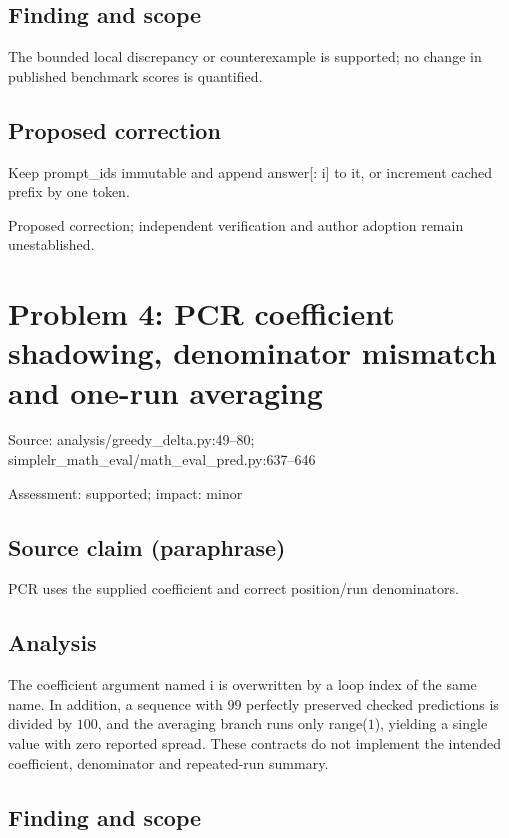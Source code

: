 \documentclass[11pt]{article}
\begin{document}
\subsection*{Finding and scope}

The bounded local discrepancy or counterexample is supported; no change in published benchmark scores is quantified.

\subsection*{Proposed correction}

Keep prompt\_ids immutable and append answer[: i] to it, or increment cached prefix by one token.

Proposed correction; independent verification and author adoption remain unestablished.

\section*{Problem 4: PCR coefficient shadowing, denominator mismatch and one-run averaging}

Source: analysis/greedy\_delta.py:49–80; simplelr\_math\_eval/math\_eval\_pred.py:637–646

Assessment: supported; impact: minor

\subsection*{Source claim (paraphrase)}

PCR uses the supplied coefficient and correct position/run denominators.

\subsection*{Analysis}

The coefficient argument named i is overwritten by a loop index of the same name. In addition, a sequence with \(99\) perfectly preserved checked predictions is divided by \(100\), and the averaging branch runs only range(\(1\)), yielding a single value with zero reported spread. These contracts do not implement the intended coefficient, denominator and repeated-run summary.

\subsection*{Finding and scope}
\end{document}

